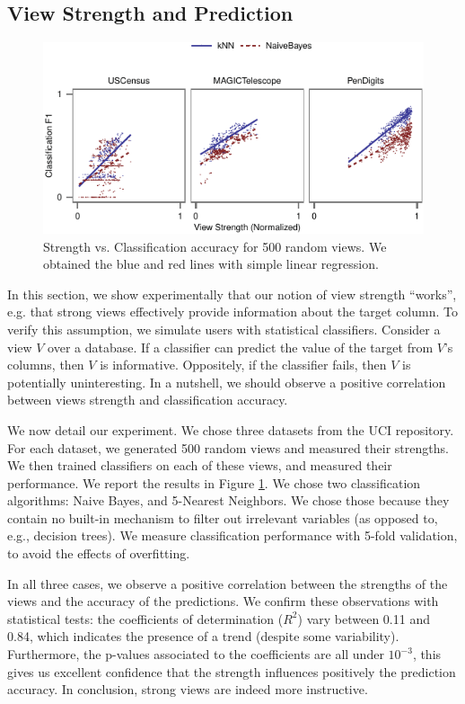 \subsection{View Strength and Prediction}
\label{sec:view-strengh}
\begin{figure}[t!]
\centering
\includegraphics[width=\columnwidth]{plots/compare-strength-f1}
\caption{Strength vs. Classification accuracy for 500 random views. We obtained
    the blue and red lines with simple linear regression.}
\label{pic:strength-vs-f1}
\end{figure}
In this section, we show experimentally that our notion of view strength
``works'', e.g. that strong views effectively provide information about the
target column. To verify this assumption, we simulate users with statistical
classifiers. Consider a view $V$ over a database. If a classifier can predict
the value of the target from $V$'s columns, then $V$ is informative.
Oppositely, if the classifier fails, then $V$ is potentially uninteresting. In
a nutshell, we should observe a positive correlation between views strength
and classification accuracy.

We now detail our experiment. We chose three datasets from the UCI repository.
For each dataset, we generated 500 random views and measured their strengths.
We then trained classifiers on each of these views, and measured their
performance. We report the results in Figure \ref{pic:strength-vs-f1}. We chose
two classification algorithms: Naive Bayes, and 5-Nearest Neighbors.  We chose
those because they contain no built-in mechanism to filter out irrelevant
variables (as opposed to, e.g., decision trees). We measure classification
performance with 5-fold validation, to avoid the effects of overfitting.

In all three cases, we observe a positive correlation between the strengths of
the views and the accuracy of the predictions. We confirm these observations
with statistical tests: the coefficients of determination ($R^2$) vary between
0.11 and 0.84, which indicates the presence of a trend (despite some
variability). Furthermore, the p-values associated to the coefficients are all
under $10^{-3}$, this gives us excellent confidence that the strength
influences positively the prediction accuracy. In conclusion, strong views are
indeed more instructive.

